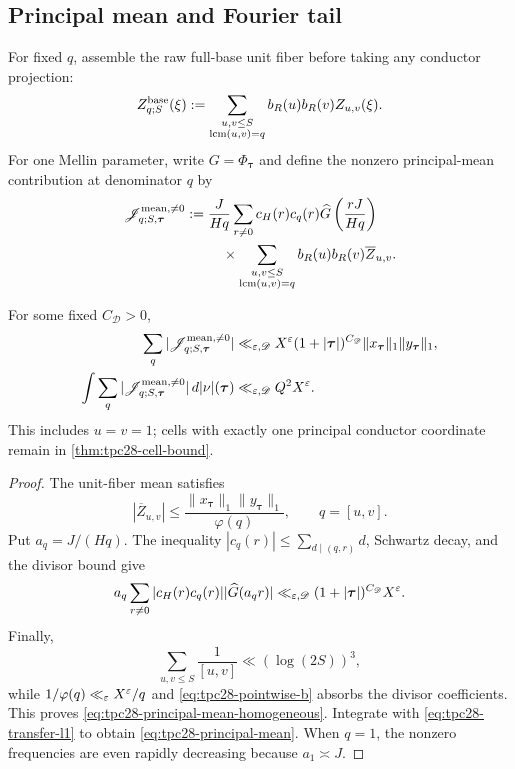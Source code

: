 \subsection{Principal mean and Fourier tail}

For fixed $q$, assemble the raw full-base unit fiber before taking
any conductor projection:
\begin{equation}
 Z_{q;S}^{\rm base}(\xi)
 :=\sum_{\substack{u,v\le S\\\operatorname{lcm}(u,v)=q}}
 b_R(u)b_R(v)Z_{u,v}(\xi).
 \label{eq:tpc28-assembled-fiber}
\end{equation}
For one Mellin parameter, write $G=\Phi_{\boldsymbol\tau}$ and define
the nonzero principal-mean contribution at denominator $q$ by
\begin{align}
 \mathscr J_{q;S,\boldsymbol\tau}^{\rm mean,\ne0}
 :={}&\frac{J}{Hq}\sum_{r\ne0}c_H(r)c_q(r)
 \widehat G\left(\frac{rJ}{Hq}\right)
 \notag\\
 &\quad\times
 \sum_{\substack{u,v\le S\\\operatorname{lcm}(u,v)=q}}
 b_R(u)b_R(v)\overline Z_{u,v}.
 \label{eq:tpc28-principal-mean-definition}
\end{align}

\begin{lemma}
\label{lem:tpc28-principal-mean}
For some fixed $C_{\mathscr D}>0$,
\begin{align}
 \sum_q|\mathscr J_{q;S,\boldsymbol\tau}^{\rm mean,\ne0}|
 &\ll_{\varepsilon,\mathscr D}X^\varepsilon
 (1+|\boldsymbol\tau|)^{C_{\mathscr D}}
 \|x_{\boldsymbol\tau}\|_1\|y_{\boldsymbol\tau}\|_1,
 \label{eq:tpc28-principal-mean-homogeneous}\\
 \int\sum_q|\mathscr J_{q;S,\boldsymbol\tau}^{\rm mean,\ne0}|
 \,d|\nu|(\boldsymbol\tau)
 &\ll_{\varepsilon,\mathscr D}Q^2X^\varepsilon.
 \label{eq:tpc28-principal-mean}
\end{align}
This includes $u=v=1$; cells with exactly one principal conductor
coordinate remain in \cref{thm:tpc28-cell-bound}.
\end{lemma}

\begin{proof}
The unit-fiber mean satisfies
\[
 |\overline Z_{u,v}|
 \le\frac{\|x_{\boldsymbol\tau}\|_1
 \|y_{\boldsymbol\tau}\|_1}{\varphi(q)},
 \qquad q=[u,v].
\]
Put $a_q=J/(Hq)$.  The inequality
$|c_q(r)|\le\sum_{d\mid(q,r)}d$, Schwartz decay, and the divisor bound
give
\[
 a_q\sum_{r\ne0}|c_H(r)c_q(r)|
 |\widehat G(a_qr)|
 \ll_{\varepsilon,\mathscr D}
 (1+|\boldsymbol\tau|)^{C_{\mathscr D}}X^\varepsilon.
\]
Finally,
\begin{equation}
 \sum_{u,v\le S}\frac1{[u,v]}\ll(\log(2S))^3,
 \label{eq:tpc28-lcm-cost}
\end{equation}
while $1/\varphi(q)\ll_\varepsilon X^\varepsilon/q$ and
\eqref{eq:tpc28-pointwise-b} absorbs the divisor coefficients.
This proves \eqref{eq:tpc28-principal-mean-homogeneous}.  Integrate
with \eqref{eq:tpc28-transfer-l1} to obtain
\eqref{eq:tpc28-principal-mean}.  When $q=1$, the nonzero frequencies
are even rapidly decreasing because $a_1\asymp J$.
\end{proof}

